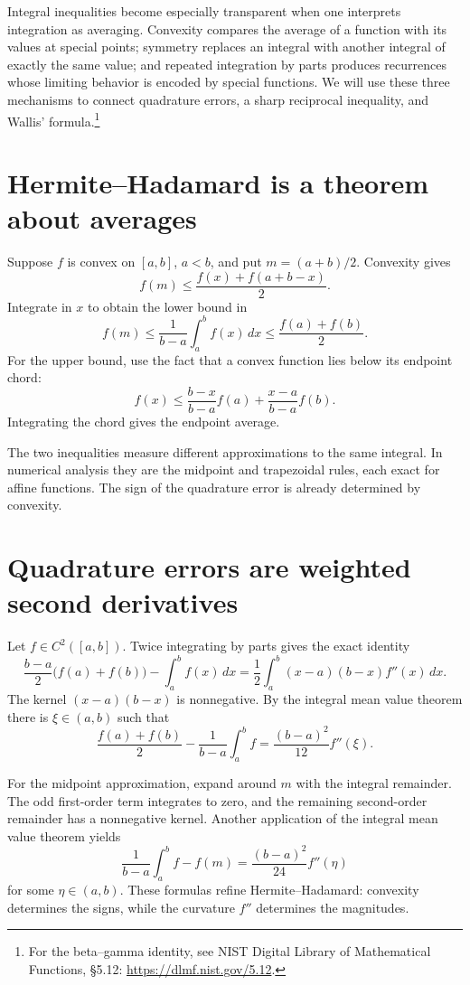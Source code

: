 
Integral inequalities become especially transparent when one interprets integration as averaging. Convexity compares the average of a function with its values at special points; symmetry replaces an integral with another integral of exactly the same value; and repeated integration by parts produces recurrences whose limiting behavior is encoded by special functions. We will use these three mechanisms to connect quadrature errors, a sharp reciprocal inequality, and Wallis' formula.\footnote{For the beta--gamma identity, see NIST Digital Library of Mathematical Functions, \S5.12: \url{https://dlmf.nist.gov/5.12}.}

\section{Hermite--Hadamard is a theorem about averages}

Suppose \(f\) is convex on \([a,b]\), \(a<b\), and put \(m=(a+b)/2\). Convexity gives
\[
 f(m)\le\frac{f(x)+f(a+b-x)}2.
\]
Integrate in \(x\) to obtain the lower bound in
\[
 \boxed{f(m)\le\frac1{b-a}\int_a^b f(x)\,dx
       \le\frac{f(a)+f(b)}2.}
\]
For the upper bound, use the fact that a convex function lies below its endpoint chord:
\[
 f(x)\le\frac{b-x}{b-a}f(a)+\frac{x-a}{b-a}f(b).
\]
Integrating the chord gives the endpoint average.

The two inequalities measure different approximations to the same integral. In numerical analysis they are the midpoint and trapezoidal rules, each exact for affine functions. The sign of the quadrature error is already determined by convexity.

\section{Quadrature errors are weighted second derivatives}

Let \(f\in C^2([a,b])\). Twice integrating by parts gives the exact identity
\[
 \frac{b-a}{2}\bigl(f(a)+f(b)\bigr)-\int_a^bf(x)\,dx
 =\frac12\int_a^b(x-a)(b-x)f''(x)\,dx.
\]
The kernel \((x-a)(b-x)\) is nonnegative. By the integral mean value theorem there is \(\xi\in(a,b)\) such that
\[
 \boxed{\frac{f(a)+f(b)}2-
 \frac1{b-a}\int_a^bf
 =\frac{(b-a)^2}{12}f''(\xi).}
\]

For the midpoint approximation, expand around \(m\) with the integral remainder. The odd first-order term integrates to zero, and the remaining second-order remainder has a nonnegative kernel. Another application of the integral mean value theorem yields
\[
 \boxed{\frac1{b-a}\int_a^bf-f(m)
 =\frac{(b-a)^2}{24}f''(\eta)}
\]
for some \(\eta\in(a,b)\). These formulas refine Hermite--Hadamard: convexity determines the signs, while the curvature \(f''\) determines the magnitudes.

